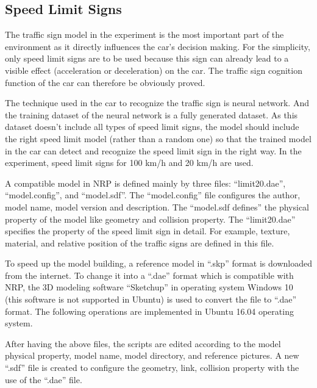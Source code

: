 \subsection{Speed Limit Signs}

The traffic sign model in the experiment is the most important part of the environment as it directly influences the car’s decision making. For the simplicity, only speed limit signs are to be used because this sign can already lead to a visible effect (acceleration or deceleration) on the car. The traffic sign cognition function of the car can therefore be obviously proved. 



The technique used in the car to recognize the traffic sign is neural network. And the training dataset of the neural network is a fully generated dataset. As this dataset doesn’t include all types of speed limit signs, the model should include the right speed limit model (rather than a random one) so that the trained model in the car can detect and recognize the speed limit sign in the right way. In the experiment, speed limit signs for 100 km/h and 20 km/h are used.



A compatible model in NRP is defined mainly by three files: ``limit20.dae'', ``model.config'', and ``model.sdf''. The ``model.config'' file configures the author, model name, model version and description. The ``model.sdf defines'' the physical property of the model like geometry and collision property. The ``limit20.dae'' specifies the property of the speed limit sign in detail. For example, texture, material, and relative position of the traffic signs are defined in this file.



To speed up the model building, a reference model in ``.skp'' format is downloaded from the internet. To change it into a ``.dae'' format which is compatible with NRP, the 3D modeling software ``Sketchup'' in operating system Windows 10 (this software is not supported in Ubuntu) is used to convert the file to ``.dae'' format. The following operations are implemented in Ubuntu 16.04 operating system. 



After having the above files, the scripts are edited according to the model physical property, model name, model directory, and reference pictures. A new ``.sdf'' file is created to configure the geometry, link, collision property with the use of the ``.dae'' file. 

